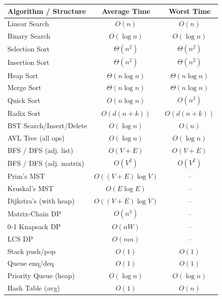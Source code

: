 \documentclass[12pt,portrait]{article}
\begin{document}
\begin{center}
{\small
\begin{longtable}{l|c|c}
\toprule
\textbf{Algorithm / Structure} & \textbf{Average Time} & \textbf{Worst Time} \\
\midrule
Linear Search & $O(n)$ & $O(n)$ \\
Binary Search & $O(\log n)$ & $O(\log n)$ \\
Selection Sort & $\Theta(n^2)$ & $\Theta(n^2)$ \\
Insertion Sort & $\Theta(n^2)$ & $\Theta(n^2)$ \\
Heap Sort & $\Theta(n\log n)$ & $\Theta(n\log n)$ \\
Merge Sort & $\Theta(n\log n)$ & $\Theta(n\log n)$ \\
Quick Sort & $O(n\log n)$ & $O(n^2)$ \\
Radix Sort & $O(d(n+k))$ & $O(d(n+k))$ \\
BST Search/Insert/Delete & $O(\log n)$ & $O(n)$ \\
AVL Tree (all ops) & $O(\log n)$ & $O(\log n)$ \\
BFS / DFS (adj. list) & $O(V+E)$ & $O(V+E)$ \\
BFS / DFS (adj. matrix) & $O(V^2)$ & $O(V^2)$ \\
Prim's MST & $O((V+E)\log V)$ & -- \\
Kruskal's MST & $O(E\log E)$ & -- \\
Dijkstra's (with heap) & $O((V+E)\log V)$ & -- \\
Matrix-Chain DP & $O(n^3)$ & -- \\
0-1 Knapsack DP & $O(nW)$ & -- \\
LCS DP & $O(mn)$ & -- \\
Stack push/pop & $O(1)$ & $O(1)$ \\
Queue enq/deq & $O(1)$ & $O(1)$ \\
Priority Queue (heap) & $O(\log n)$ & $O(\log n)$ \\
Hash Table (avg) & $O(1)$ & $O(n)$ \\
\bottomrule
\end{longtable}
}
\end{center}
\end{document}
